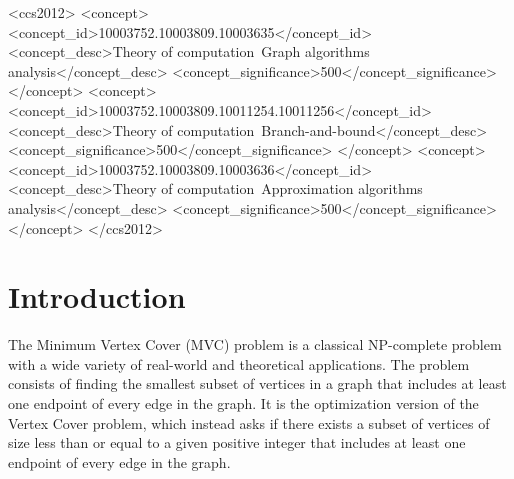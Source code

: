 \documentclass[acmlarge]{acmart}
\begin{document}
\begin{CCSXML}
	<ccs2012>
	<concept>
	<concept_id>10003752.10003809.10003635</concept_id>
	<concept_desc>Theory of computation~Graph algorithms analysis</concept_desc>
	<concept_significance>500</concept_significance>
	</concept>
	<concept>
	<concept_id>10003752.10003809.10011254.10011256</concept_id>
	<concept_desc>Theory of computation~Branch-and-bound</concept_desc>
	<concept_significance>500</concept_significance>
	</concept>
	<concept>
	<concept_id>10003752.10003809.10003636</concept_id>
	<concept_desc>Theory of computation~Approximation algorithms analysis</concept_desc>
	<concept_significance>500</concept_significance>
	</concept>
	</ccs2012>
\end{CCSXML}




\maketitle

\section{Introduction}


The Minimum Vertex Cover (MVC) problem is a classical NP-complete problem with a wide variety of real-world and theoretical applications. The problem consists of finding the smallest subset of vertices in a graph that includes at least one endpoint of every edge in the graph. It is the optimization version of the Vertex Cover problem, which instead asks if there exists a subset of vertices of size less than or equal to a given positive integer that includes at least one endpoint of every edge in the graph.
\end{document}
